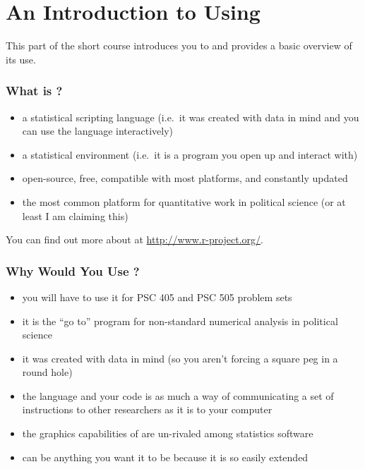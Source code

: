 \part{An Introduction to Using \R}

This part of the short course introduces you to \R{} and provides a
basic overview of its use.

\section{What is \R?}

\begin{itemize}
\item a statistical scripting language (i.e.\ it was created with data
  in mind and you can use the language interactively)

\item a statistical environment (i.e.\ it is a program you open up and
  interact with)

\item open-source, free, compatible with most platforms, and
  constantly updated

\item the most common platform for quantitative work in political
  science (or at least I am claiming this)

\end{itemize}

You can find out more about \R{} at \url{http://www.r-project.org/}.

\section{Why Would You Use \R{}?}
\begin{itemize}
\item you will have to use it for PSC 405 and PSC 505 problem sets

\item it is the ``go to'' program for non-standard numerical analysis
  in political science

\item it was created with data in mind (so you aren't forcing a square
  peg in a round hole)

\item the language and your code is as much a way of communicating a
  set of instructions to other researchers as it is to your computer

\item the graphics capabilities of \R{} are un-rivaled among statistics
  software

\item \R{} can be anything you want it to be because it is so easily
  extended

\end{itemize}

